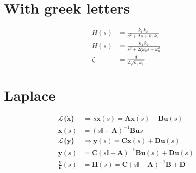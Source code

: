 \section{With greek letters}
\begin{align}
	H(s) &= \frac{k_1\, k_2}{s^2 + d\,s + k_1\, k_2}\\
	H(s) &= \frac{k_1\, k_2}{s^2 + 2 \zeta \omega_0 s + \omega_0^2}\\
	\zeta &= \frac{d}{2\sqrt{k_1\, k_2}} \label{zeta 1}
\end{align}

\section{Laplace}
\begin{align}
	\mathcal{L}\{\dot{\mathbf{x}}\} &\Rightarrow s\mathbf{x}(s) = \mathbf{Ax}(s) + \mathbf{Bu}(s)\\
	\mathbf{x}(s) &= (s\mathbb{I} - \mathbf{A})^{-1} \mathbf{Bu}s\\
	\mathcal{L}\{\mathbf{y}\} &\Rightarrow \mathbf{y}(s) = \mathbf{Cx}(s) + \mathbf{Du}(s)\\
	\mathbf{y}(s)  &= \mathbf{C} (s\mathbb{I} - \mathbf{A})^{-1} \mathbf{Bu}(s) + \mathbf{Du}(s)\\
	\frac{\mathbf{y}}{\mathbf{u}}(s) &= \mathbf{H}(s) = \mathbf{C} (s\mathbb{I} - \mathbf{A})^{-1} \mathbf{B} + \mathbf{D}
\end{align}